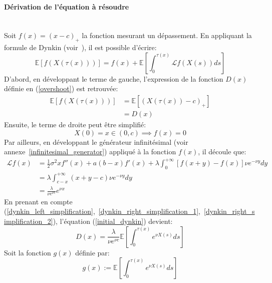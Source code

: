 \paragraph{Dérivation de l'équation à résoudre}\phantom{}\\
Soit $f(x)=(x-c)_+$ la fonction mesurant un dépassement. En appliquant la formule de Dynkin (voir~\cite{dynkin1965}), il est possible d'écrire:
\begin{equation}\label{initial_dynkin}
    \mathds{E}[f(X(\tau(x)))]=f(x)+\mathds{E}\left[\int_0^{\tau(x)}\mathcal{L}f(X(s))ds\right]
\end{equation}
D'abord, en développant le terme de gauche, l'expression de la fonction $D(x)$ définie en (\ref{overshoot}) est retrouvée:
\begin{equation}\label{dynkin_left_simplification}
    \begin{aligned}
        \mathds{E}[f(X(\tau(x)))]&=\mathds{E}\left[(X(\tau(x))-c)_+\right]\\
        &=D(x)
    \end{aligned}
\end{equation}
Ensuite, le terme de droite peut être simplifié: 
\begin{equation}\label{dynkin_right_simplification_1}
    X(0)=x\in(0,c)\implies f(x)=0
\end{equation}
Par ailleurs, en développant le générateur infinitésimal (voir annexe~\ref{infinitesimal_generator}) appliqué à la fonction $f(x)$, il découle que:
\begin{equation}\label{dynkin_right_simplification_2}
    \begin{aligned}
        \mathcal{L}f(x)&=\frac{1}{2}\sigma^2xf''(x)+a(b-x)f'(x)+\lambda\int_0^{+\infty}\left[f(x+y)-f(x)\right]\nu e^{-\nu y}dy \\
        &=\lambda\int_{c-x}^{+\infty}(x+y-c)\nu e^{-\nu y}dy \\
        &=\frac{\lambda}{\nu e^{\nu c}}e^{\nu x}
    \end{aligned}
\end{equation}
En prenant en compte (\ref{dynkin_left_simplification},~\ref{dynkin_right_simplification_1},~\ref{dynkin_right_simplification_2}), l'équation (\ref{initial_dynkin}) devient:
\begin{equation}\label{simplified_dynkin}
    D(x)=\frac{\lambda}{\nu e^{\nu c}}\mathds{E}\left[\int_0^{\tau(x)}e^{\nu X(s)}ds\right]
\end{equation}
Soit la fonction $g(x)$ définie par:
\begin{equation}\label{g_defintion}
    g(x):=\mathds{E}\left[\int_0^{\tau(x)}e^{\nu X(s)}ds\right]
\end{equation}
